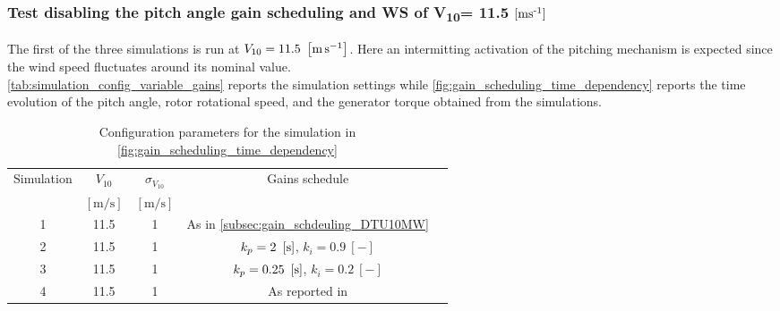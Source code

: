 \subsubsection[$V_{10}=11.5 \, \mesunt{\meter\per\second}$]{Test disabling the pitch angle gain scheduling and WS of V\textsubscript{10}= 11.5 $\left[ \text{ms}\textsuperscript{-1} \right]$}
The first of the three simulations is run at $V_{10} = 11.5 \ \left[\si{\meter\per\second}\right]$. Here an intermitting activation of the pitching mechanism is expected since the wind speed fluctuates around its nominal value.\\
\autoref{tab:simulation_config_variable_gains} reports the simulation settings while \autoref{fig:gain_scheduling_time_dependency} reports the time evolution of the pitch angle, rotor rotational speed, and the generator torque obtained from the simulations. 

\begin{table}[htb]
  \caption{Configuration parameters for the simulation in \autoref{fig:gain_scheduling_time_dependency}}
  \centering
  \begin{tabular}{ccccc}
  \toprule
    Simulation & $V_{10}$  & $\sigma_{V_{10}}$ & Gains schedule \\ 
     & $\left[\si{\meter\per\second}\right]$ & $\left[\si{\meter\per\second}\right]$ & \\ \midrule       
     1 & 11.5 & 1 & As in \autoref{subsec:gain_schdeuling_DTU10MW}  \\
     2 & 11.5 & 1 & $k_p = 2 \ \mesunt{\second}$, $k_i=0.9 \ [-]$ \\
     3 & 11.5 & 1 & $k_p = 0.25 \ \mesunt{\second}$, $k_i=0.2 \ [-]$  \\
     4 & 11.5 & 1 & As reported in \cite{Olimpo_Anaya‐Lara}  \\
     \bottomrule
  \end{tabular}
  \label{tab:simulation_config_variable_gains}
\end{table}


